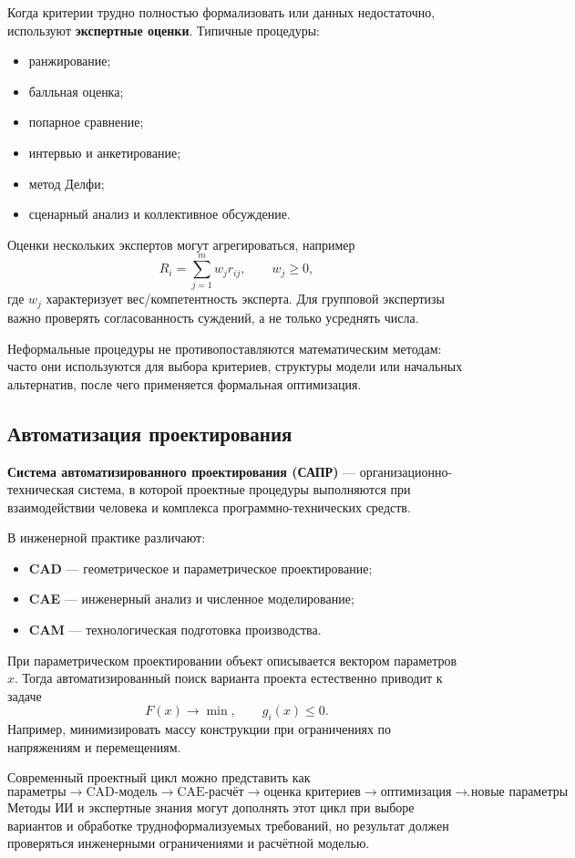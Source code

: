 Когда критерии трудно полностью формализовать или данных недостаточно, используют \textbf{экспертные оценки}. Типичные процедуры:
\begin{itemize}
\item ранжирование;
\item балльная оценка;
\item попарное сравнение;
\item интервью и анкетирование;
\item метод Делфи;
\item сценарный анализ и коллективное обсуждение.
\end{itemize}

Оценки нескольких экспертов могут агрегироваться, например
\[
R_i=\sum_{j=1}^{m}w_jr_{ij},
\qquad w_j\ge0,
\]
где $w_j$ характеризует вес/компетентность эксперта. Для групповой экспертизы важно проверять согласованность суждений, а не только усреднять числа.

Неформальные процедуры не противопоставляются математическим методам: часто они используются для выбора критериев, структуры модели или начальных альтернатив, после чего применяется формальная оптимизация.

\subsection{Автоматизация проектирования}

\textbf{Система автоматизированного проектирования (САПР)} --- организационно-техническая система, в которой проектные процедуры выполняются при взаимодействии человека и комплекса программно-технических средств.

В инженерной практике различают:
\begin{itemize}
\item \textbf{CAD} --- геометрическое и параметрическое проектирование;
\item \textbf{CAE} --- инженерный анализ и численное моделирование;
\item \textbf{CAM} --- технологическая подготовка производства.
\end{itemize}

При параметрическом проектировании объект описывается вектором параметров $x$. Тогда автоматизированный поиск варианта проекта естественно приводит к задаче
\[
F(x)\to\min,
\qquad g_i(x)\le0.
\]
Например, минимизировать массу конструкции при ограничениях по напряжениям и перемещениям.

Современный проектный цикл можно представить как
\[
\boxed{
\text{параметры}
\rightarrow
\text{CAD-модель}
\rightarrow
\text{CAE-расчёт}
\rightarrow
\text{оценка критериев}
\rightarrow
\text{оптимизация}
\rightarrow
\text{новые параметры}}.
\]
Методы ИИ и экспертные знания могут дополнять этот цикл при выборе вариантов и обработке трудноформализуемых требований, но результат должен проверяться инженерными ограничениями и расчётной моделью.

